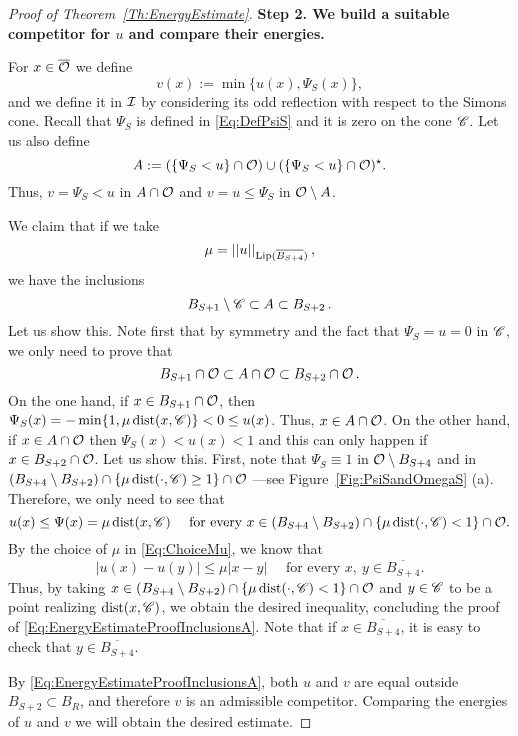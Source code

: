 \begin{proof}[Proof of Theorem~\ref{Th:EnergyEstimate}]
\textbf{Step 2. We build a suitable competitor for $u$ and compare their energies.}

For $x\in \overline{\mathcal{O}}$ we define
$$ 
v(x) := \min\{u(x),\Psi_S(x)\}, 
$$
and we define it in $\mathcal{I}$ by considering its odd reflection with respect to the Simons cone. Recall that $\Psi_S$ is defined in \eqref{Eq:DefPsiS} and it is zero on the cone $\mathscr{C}$. Let us also define
$$
A :=(\{\Psi_S < u\}\cap \mathcal{O}) \cup (\{\Psi_S < u\}\cap \mathcal{O})^\star. 
$$
Thus, $v = \Psi_S < u$ in $A\cap \mathcal{O}$ and $v=u\leq\Psi_S$ in $\mathcal{O} \setminus A$. 

We claim that if we take
\begin{equation}
	\label{Eq:ChoiceMu}
	\mu = \left | \left |{u} \right | \right |_{\mathrm{Lip}(\overline{B_{S+4}})},
\end{equation}
we have the inclusions
\begin{equation}
\label{Eq:EnergyEstimateProofInclusionsA}
	B_{S+1}\setminus \mathscr{C} \subset A \subset B_{S+2}\,.
\end{equation}
Let us show this. Note first that by symmetry and the fact that $\Psi_S = u =0$ in $\mathscr{C}$, we only need to prove that 
$$
	B_{S+1} \cap \mathcal{O}\subset A \cap \mathcal{O}\subset B_{S+2}\cap \mathcal{O}\,.
$$
On the one hand, if $ x\in B_{S+1}\cap \mathcal{O}$, then $\Psi_S(x) = -\min\{1,\mu\operatorname{dist}(x,\mathscr{C})\} < 0 \leq u(x)$. Thus, $x\in A\cap \mathcal{O}$. On the other hand, if $ x\in A\cap \mathcal{O}$ then $\Psi_S(x) < u(x) < 1$ and this can only happen if $x\in B_{S+2}\cap \mathcal{O}$. Let us show this. First, note that $\Psi_S \equiv 1$ in $\mathcal{O}\setminus B_{S+4}$ and in $(B_{S+4}\setminus B_{S+2})\cap \{\mu \operatorname{dist}(\cdot, \mathscr{C})\geq 1\} \cap \mathcal{O}$ ---see Figure~\ref{Fig:PsiSandOmegaS} (a). Therefore, we only need to see that 
$$
u(x) \leq \Psi(x) = \mu \operatorname{dist} (x,\mathscr{C}) \quad \text{ for every } x \in (B_{S+4}\setminus B_{S+2})\cap \{\mu \operatorname{dist}(\cdot, \mathscr{C})< 1\} \cap \mathcal{O}.
$$
By the choice of $\mu$ in \eqref{Eq:ChoiceMu}, we know that
$$
|u(x) - u(y)|\leq \mu |x-y| \quad \text{ for every } x, \ y \in \overline{B_{S+4}}.
$$
Thus, by taking $x \in (B_{S+4}\setminus B_{S+2})\cap \{\mu \operatorname{dist}(\cdot, \mathscr{C})< 1\} \cap \mathcal{O}$ and  $y\in \mathscr{C}$ to be a point realizing $\operatorname{dist}(x,\mathscr{C})$, we obtain the desired inequality, concluding the proof of \eqref{Eq:EnergyEstimateProofInclusionsA}. Note that if $x\in \overline{B_{S+4}}$, it is easy to check that $y\in \overline{B_{S+4}}$.

By \eqref{Eq:EnergyEstimateProofInclusionsA}, both $u$ and $v$ are equal outside $B_{S+2} \subset B_R$, and therefore $v$ is an admissible competitor. Comparing the energies of $u$ and $v$ we will obtain the desired estimate. 


\end{proof}
